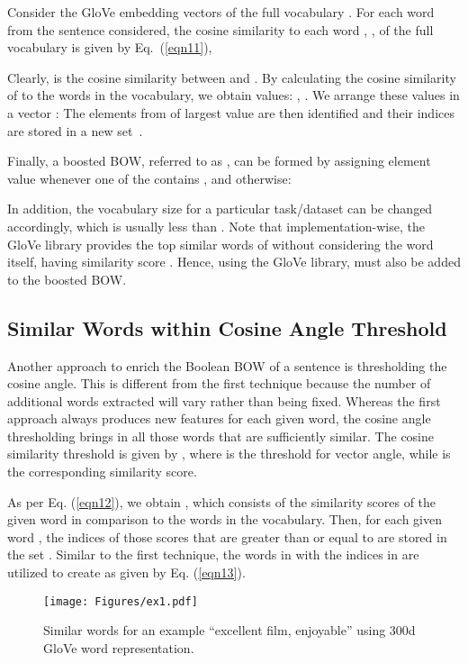 \documentclass[11pt]{article}
\begin{document}
 Consider the GloVe embedding vectors  of the full vocabulary . For each word  from the sentence considered, the cosine similarity to each word , , of the full vocabulary is given by Eq.~(\ref{eqn11}),
 
{\small
}
\noindent 
Clearly,  is the cosine similarity between  and .
By calculating the cosine similarity of  to the words in the vocabulary, we obtain  values: , . We arrange these values in a vector :
{\small}
The  elements from  of largest value are then identified and their indices are stored in a new set~.

Finally, a boosted BOW, referred to as , can be formed by assigning element  value  whenever one of the  contains , and  otherwise:

{\small}
In addition, the vocabulary size for a particular task/dataset can be changed accordingly, which is usually less than .
Note that implementation-wise, the GloVe library provides the top  similar words of  without considering the word  itself, having similarity score . Hence, using the GloVe library,   must also be added to the boosted BOW.

\subsection{Similar Words within Cosine Angle Threshold}
Another approach to enrich the Boolean BOW of a sentence  is thresholding the cosine angle. This is different from the first technique because the number of additional words extracted will vary rather than being fixed. Whereas the first approach always produces  new features for each given word, the cosine angle thresholding brings in all those words that are sufficiently similar. The cosine similarity threshold is given by ,
where  is the threshold for vector angle, while  is the corresponding similarity score.

\par As per Eq. (\ref{eqn12}), we obtain , which consists of the similarity scores of the given word  in comparison to the  words in the vocabulary. Then, for each given word , the indices of those scores  that are greater than or equal to    are stored in the set . Similar to the first technique, the words in  with the indices in  are utilized to create  as given by Eq. (\ref{eqn13}).

\begin{figure}
    \centering
    \texttt{[image: Figures/ex1.pdf]}
    \caption{Similar words for an example ``excellent film, enjoyable'' using 300d GloVe word representation.}
    \label{fig2}
\end{figure}
\end{document}
